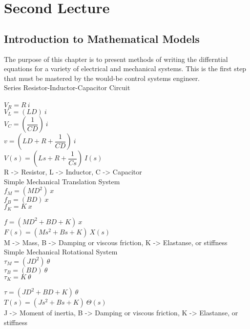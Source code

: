 \setchapterpreamble[u]{\margintoc}
\chapter{Second Lecture}

\section[Intro. to Mathematical Models]{Introduction to Mathematical Models}

The purpose of this chapter is to present methods of writing the differntial equations for a variety of electrical and mechanical systems.
This is the first step that must be mastered by the would-be control systems engineer.\\

Series Resistor-Inductor-Capacitor Circuit\\ \\
$V_R=R\ i$\\
$V_L=(LD)\ i$\\
$V_C=(\dfrac{1}{CD})\ i$\\

$v = (LD + R + \dfrac{1}{CD})\ i$\\
$V(s) = (Ls + R + \dfrac{1}{Cs})\ I(s)$\\

R -> Resistor, L -> Inductor, C -> Capacitor\\

Simple Mechanical Translation System\\
$f_M=(MD^2)\ x$\\
$f_B=(BD)\ x$\\
$f_K=K\ x$

$f = (MD^2+BD+K)\ x$\\
$F(s) = (Ms^2+Bs+K)\ X(s)$\\

M -> Mass, B -> Damping or viscous friction, K -> Elastanse, or stiffness\\

Simple Mechanical Rotational System\\
$\tau_M=(JD^2)\ \theta$\\
$\tau_B=(BD)\ \theta$\\
$\tau_K=K\ \theta$

$\tau = (JD^2+BD+K)\ \theta$\\
$T(s) = (Js^2+Bs+K)\ \Theta(s)$\\

J -> Moment of inertia, B -> Damping or viscous friction, K -> Elastanse, or stiffness\\

